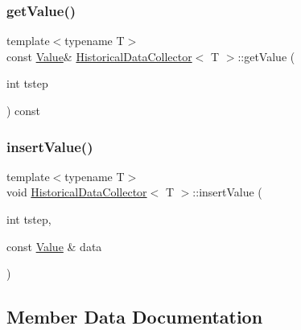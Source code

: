 \mbox{\label{class_historical_data_collector_a97c5feae3dc9b4280dfb108be59ab467}} 
\subsubsection{\texorpdfstring{getValue()}{getValue()}}
{\footnotesize\ttfamily template$<$typename T$>$ \\
const \mbox{\hyperlink{class_historical_data_collector_a8b64738808b9cea9f590c86b2685c944}{Value}}\& \mbox{\hyperlink{class_historical_data_collector}{Historical\+Data\+Collector}}$<$ T $>$\+::get\+Value (\begin{DoxyParamCaption}\item[{int}]{tstep }\end{DoxyParamCaption}) const\hspace{0.3cm}{\ttfamily [inline]}}

\mbox{\label{class_historical_data_collector_a8d622665dcac616619fc4a47a34bd603}} 
\subsubsection{\texorpdfstring{insertValue()}{insertValue()}}
{\footnotesize\ttfamily template$<$typename T$>$ \\
void \mbox{\hyperlink{class_historical_data_collector}{Historical\+Data\+Collector}}$<$ T $>$\+::insert\+Value (\begin{DoxyParamCaption}\item[{int}]{tstep,  }\item[{const \mbox{\hyperlink{class_historical_data_collector_a8b64738808b9cea9f590c86b2685c944}{Value}} \&}]{data }\end{DoxyParamCaption})\hspace{0.3cm}{\ttfamily [inline]}}



\subsection{Member Data Documentation}
\mbox{\label{class_historical_data_collector_a38ce7ae12ccfa107916c439ec273c8a5}} 

